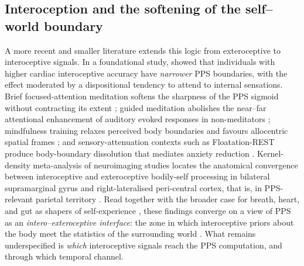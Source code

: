 \subsection{Interoception and the softening of the self--world boundary}


A more recent and smaller literature extends this logic from exteroceptive to interoceptive signals. In a foundational study, \citet{Ardizzi2018} showed that individuals with higher cardiac interoceptive accuracy have \emph{narrower} PPS boundaries, with the effect moderated by a dispositional tendency to attend to internal sensations. Brief focused-attention meditation softens the sharpness of the PPS sigmoid without contracting its extent \citep{Chiarella2024}; guided meditation abolishes the near--far attentional enhancement of auditory evoked responses in non-meditators \citep{nguyen_2020}; mindfulness training relaxes perceived body boundaries and favours allocentric spatial frames \citep{hanley_2020}; and sensory-attenuation contexts such as Floatation-REST produce body-boundary dissolution that mediates anxiety reduction \citep{hruby_2024}. Kernel-density meta-analysis of neuroimaging studies locates the anatomical convergence between interoceptive and exteroceptive bodily-self processing in bilateral supramarginal gyrus and right-lateralised peri-central cortex, that is, in PPS-relevant parietal territory \citep{salvato_2020}. Read together with the broader case for breath, heart, and gut as shapers of self-experience \citep{seth2013interoceptive, barrett2016theory, Park2019, bogdanova_2021}, these findings converge on a view of PPS as an \emph{intero--exteroceptive interface}: the zone in which interoceptive priors about the body meet the statistics of the surrounding world \citep{salvato_2020, bogdanova_2021, noel_2021}. What remains underspecified is \emph{which} interoceptive signals reach the PPS computation, and through which temporal channel.

